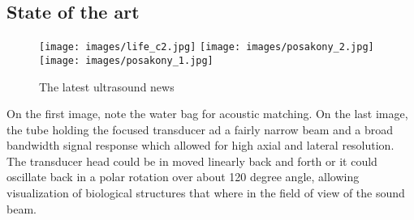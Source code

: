 \subsection{State of the art}

\begin{figure}[htp]

\centering
\texttt{[image: images/life\_c2.jpg]}\hfill
\texttt{[image: images/posakony\_2.jpg]}\hfill
\texttt{[image: images/posakony\_1.jpg]}
    \vspace{-5pt}
\caption{The latest ultrasound news}
    \vspace{-7pt}

\end{figure}

On the first image, note the water bag for acoustic matching. On the last image, the tube holding the focused transducer ad a fairly narrow beam and a broad bandwidth signal response which allowed for high axial and lateral resolution. The transducer head could be in moved linearly back and forth or it could oscillate back in a polar rotation over about 120 degree angle, allowing visualization of biological structures that where in the field of view of the sound beam.